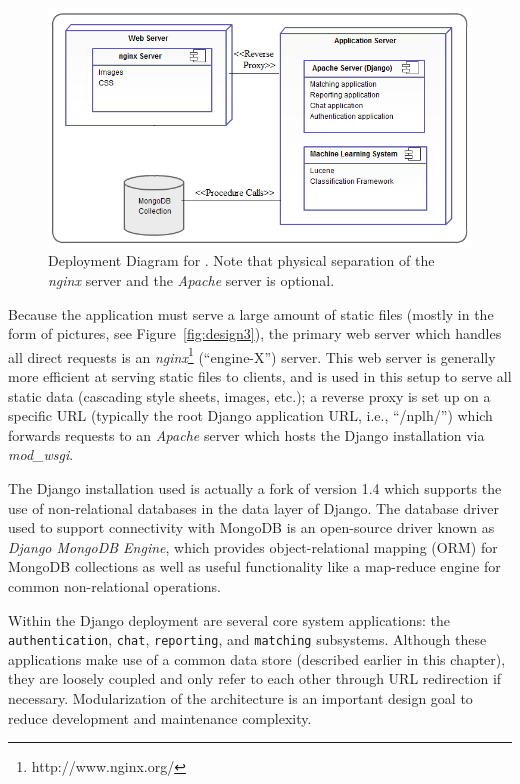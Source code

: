 \begin{figure}[htbp]
    \begin{center}
	\includegraphics[width=150mm]{figs/deployment.png}
    \end{center}
        \caption[Deployment Diagram]{
        Deployment Diagram for \nplh.  Note that physical separation of the {\em nginx} server and the {\em Apache} server is optional.
	}
	 \label{fig:deployment}
\end{figure}

Because the application must serve a large amount of static files (mostly in the form of pictures, see Figure~\ref{fig:design3}), the primary web server which handles all direct requests is an {\em nginx}\footnote{http://www.nginx.org/} (``engine-X'') server.  This web server is generally more efficient at serving static files to clients, and is used in this setup to serve all static data (cascading style sheets, images, etc.); a reverse proxy is set up on a specific URL (typically the root Django application URL, i.e., ``/nplh/'') which forwards requests to an {\em Apache} server which hosts the Django installation via {\em mod\_wsgi}.

The Django installation used is actually a fork of version 1.4 which supports the use of non-relational databases in the data layer of Django.  The database driver used to support connectivity with MongoDB is an open-source driver known as {\em Django MongoDB Engine}, which provides object-relational mapping (ORM) for MongoDB collections as well as useful functionality like a map-reduce engine for common non-relational operations.

Within the Django deployment are several core system applications: the {\tt authentication}, {\tt chat}, {\tt reporting}, and {\tt matching} subsystems.  Although these applications make use of a common data store (described earlier in this chapter), they are loosely coupled and only refer to each other through URL redirection if necessary.  Modularization of the architecture is an important design goal to reduce development and maintenance complexity.

